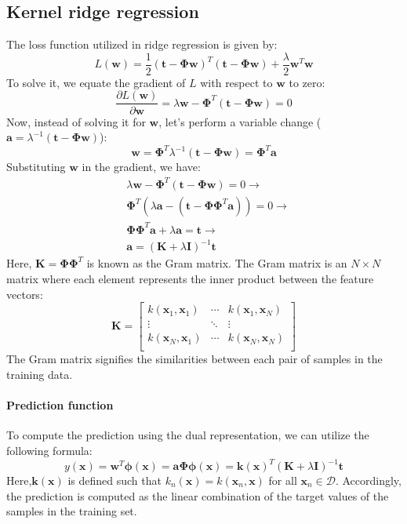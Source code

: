 \subsection{Kernel ridge regression}
The loss function utilized in ridge regression is given by:
\[L(\textbf{w})=\dfrac{1}{2}{\left(\textbf{t}-\boldsymbol{\Phi}\textbf{w}\right)}^T\left(\textbf{t}-\boldsymbol{\Phi}\textbf{w}\right)+\dfrac{\lambda}{2}\textbf{w}^T\textbf{w}\]
To solve it, we equate the gradient of $L$ with respect to $\textbf{w}$ to zero:
\[\dfrac{\partial L(\textbf{w})}{\partial \textbf{w}}=\lambda\textbf{w}-\boldsymbol{\Phi}^T(\textbf{t}-\boldsymbol{\Phi}\textbf{w})=0\]
Now, instead of solving it for $\textbf{w}$, let's perform a variable change ($\textbf{a}=\lambda^{-1}(\textbf{t}-\boldsymbol{\Phi}\textbf{w})$):
\[\textbf{w}=\boldsymbol{\Phi}^T\lambda^{-1}(\textbf{t}-\boldsymbol{\Phi}\textbf{w})=\boldsymbol{\Phi}^T\textbf{a}\]
Substituting $\textbf{w}$ in the gradient, we have:
\begin{align*}
    &\lambda\textbf{w}-\boldsymbol{\Phi}^T(\textbf{t}-\boldsymbol{\Phi}\textbf{w})=0 \rightarrow \\
    &\boldsymbol{\Phi}^T\left(\lambda \textbf{a} -\left( \textbf{t}-\boldsymbol{\Phi}\boldsymbol{\Phi}^T\textbf{a}\right) \right)=0 \rightarrow \\
    &\boldsymbol{\Phi}\boldsymbol{\Phi}^T\textbf{a} + \lambda \textbf{a} =\textbf{t} \rightarrow \\
    &\textbf{a} = {\left(\textbf{K}+\lambda \textbf{I}\right)}^{-1}\textbf{t}
\end{align*}
Here, $\textbf{K}=\boldsymbol{\Phi}\boldsymbol{\Phi}^T$ is known as the Gram matrix.
The Gram matrix is an $N\times N$ matrix where each element represents the inner product between the feature vectors:
\[\textbf{K}=\begin{bmatrix}
    k(\textbf{x}_1,\textbf{x}_1)    & \cdots     & k(\textbf{x}_1,\textbf{x}_N)  \\
    \vdots                          & \ddots    & \vdots                        \\
    k(\textbf{x}_N,\textbf{x}_1)    & \cdots     & k(\textbf{x}_N,\textbf{x}_N)  \\
\end{bmatrix}\]
The Gram matrix signifies the similarities between each pair of samples in the training data.

\paragraph*{Prediction function}
To compute the prediction using the dual representation, we can utilize the following formula:
\[y(\textbf{x})=\textbf{w}^T\boldsymbol{\phi}(\textbf{x})=\textbf{a}\boldsymbol{\Phi}\boldsymbol{\phi}(\textbf{x})=\textbf{k}{(\textbf{x})}^T{(\textbf{K}+\lambda\textbf{I})}^{-1}\textbf{t}\]
Here,$\textbf{k}(\textbf{x})$ is defined such that $k_n(\textbf{x})=k(\textbf{x}_n,\textbf{x})$ for all $\textbf{x}_n\in\mathcal{D}$. 
Accordingly, the prediction is computed as the linear combination of the target values of the samples in the training set.

